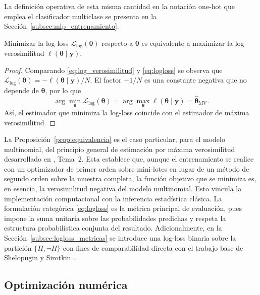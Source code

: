 \begin{obs}
	La definici\'on operativa de esta misma cantidad en la notaci\'on one-hot que emplea el clasificador multiclase se presenta en la Secci\'on~\ref{subsec:mlp_entrenamiento}.
\end{obs}

\begin{prop}\label{prop:equivalencia}
	Minimizar la log-loss $\mathcal{L}_{\mathrm{log}}(\boldsymbol{\theta})$ respecto a $\boldsymbol{\theta}$ es equivalente a maximizar la log-verosimilitud $\ell(\boldsymbol{\theta} \mid \mathbf{y})$.
\end{prop}

\begin{proof}
	Comparando \eqref{eq:log_verosimilitud} y \eqref{eq:logloss} se observa que $\mathcal{L}_{\mathrm{log}}(\boldsymbol{\theta}) = -\ell(\boldsymbol{\theta} \mid \mathbf{y})/N$. El factor $-1/N$ es una constante negativa que no depende de $\boldsymbol{\theta}$, por lo que
	\[
	\arg\min_{\boldsymbol{\theta}} \mathcal{L}_{\mathrm{log}}(\boldsymbol{\theta}) = \arg\max_{\boldsymbol{\theta}} \ell(\boldsymbol{\theta} \mid \mathbf{y}) = \hat{\boldsymbol{\theta}}_{\mathrm{MV}}.
	\]
	As\'i, el estimador que minimiza la log-loss coincide con el estimador de m\'axima verosimilitud.
\end{proof}

La Proposici\'on~\ref{prop:equivalencia} es el caso particular, para el modelo multinomial, del principio general de estimaci\'on por m\'axima verosimilitud desarrollado en \cite{hernandezBenito}, Tema~2. Esta establece que, aunque el entrenamiento se realice con un optimizador de primer orden sobre mini-lotes en lugar de un m\'etodo de segundo orden sobre la muestra completa, la funci\'on objetivo que se minimiza es, en esencia, la verosimilitud negativa del modelo multinomial. Esto vincula la implementaci\'on computacional con la inferencia estad\'istica cl\'asica. La formulaci\'on categ\'orica \eqref{eq:logloss} es la m\'etrica principal de evaluaci\'on, pues impone la suma unitaria sobre las probabilidades predichas y respeta la estructura probabil\'istica conjunta del resultado. Adicionalmente, en la Secci\'on~\ref{subsec:logloss_metricas} se introduce una log-loss binaria sobre la partici\'on $\{H, \neg H\}$ con fines de  comparabilidad directa con el trabajo base de Shelopugin y Sirotkin \cite{Glicko2Mod}.

\subsection{Optimizaci\'on num\'erica}
\label{subsec:optimizacion}

